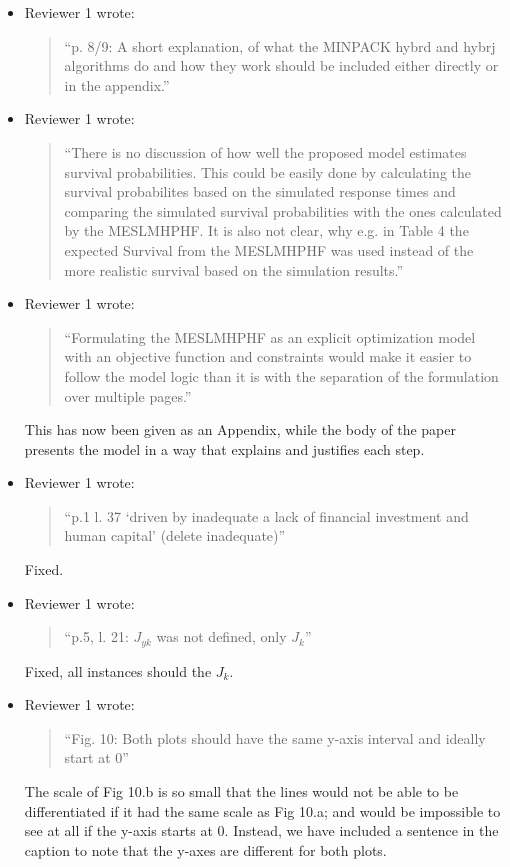 \documentclass{article}
\begin{document}
\begin{itemize}
\item Reviewer 1 wrote:
\begin{quote}
``p. 8/9: A short explanation, of what the MINPACK hybrd and hybrj algorithms do and how they work should be included either directly or in the appendix.''
\end{quote}

\item Reviewer 1 wrote:
\begin{quote}
``There is no discussion of how well the proposed model estimates survival probabilities. This could be easily done by calculating the survival probabilites based on the simulated response times and comparing the simulated survival probabilities with the ones calculated by the MESLMHPHF. It is also not clear, why e.g. in Table 4 the expected Survival from the MESLMHPHF was used instead of the more realistic survival based on the simulation results.''
\end{quote}

\item Reviewer 1 wrote:
\begin{quote}
``Formulating the MESLMHPHF as an explicit optimization model with an objective function and constraints would make it easier to follow the model logic than it is with the separation of the formulation over multiple pages.''
\end{quote}
This has now been given as an Appendix, while the body of the paper presents the model in a way that explains and justifies each step.

\item Reviewer 1 wrote:
\begin{quote}
``p.1 l. 37 ‘driven by inadequate a lack of financial investment and human capital’ (delete inadequate)''
\end{quote}
Fixed.

\item Reviewer 1 wrote:
\begin{quote}
``p.5, l. 21: $J_{yk}$ was not defined, only $J_k$''
\end{quote}
Fixed, all instances should the $J_k$.

\item Reviewer 1 wrote:
\begin{quote}
``Fig. 10: Both plots should have the same y-axis interval and ideally start
at 0''
\end{quote}
The scale of Fig 10.b is so small that the lines would not be able to be differentiated if it had the same scale as Fig 10.a; and would be impossible to see at all if the y-axis starts at 0. Instead, we have included a sentence in the caption to note that the y-axes are different for both plots.


\end{itemize}
\end{document}
